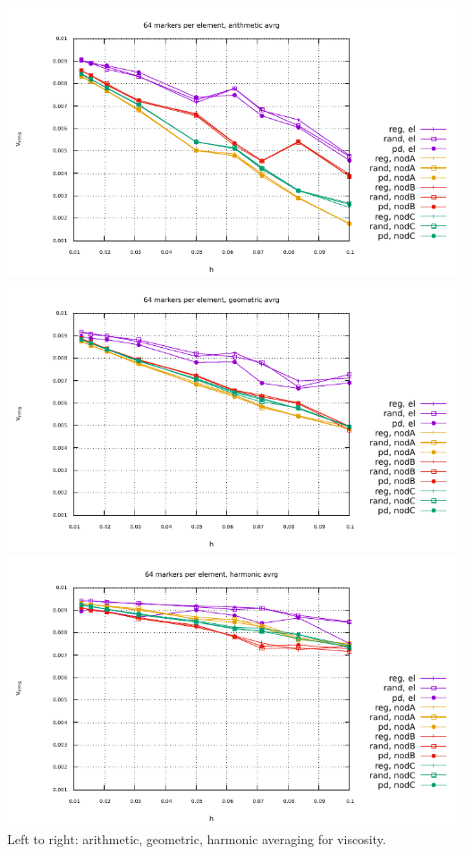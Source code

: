 \begin{center}
\includegraphics[width=5.cm]{python_codes/fieldstone_13/vrms_am} 
\includegraphics[width=5.cm]{python_codes/fieldstone_13/vrms_gm} 
\includegraphics[width=5.cm]{python_codes/fieldstone_13/vrms_hm}\\
{\small Left to right: arithmetic, geometric, harmonic averaging for viscosity.}
\end{center}
